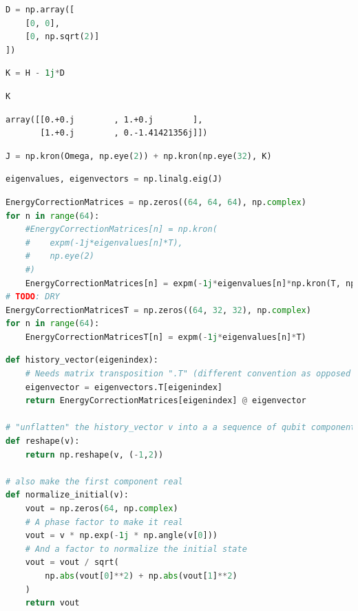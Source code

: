 \begin{lstlisting}[language=Python]
D = np.array([
    [0, 0],
    [0, np.sqrt(2)]
])
\end{lstlisting}

\begin{lstlisting}[language=Python]
K = H - 1j*D
\end{lstlisting}

\begin{lstlisting}[language=Python]
K
\end{lstlisting}

\begin{lstlisting}
array([[0.+0.j        , 1.+0.j        ],
       [1.+0.j        , 0.-1.41421356j]])
\end{lstlisting}

\begin{lstlisting}[language=Python]
J = np.kron(Omega, np.eye(2)) + np.kron(np.eye(32), K)
\end{lstlisting}

\begin{lstlisting}[language=Python]
eigenvalues, eigenvectors = np.linalg.eig(J)
\end{lstlisting}

\begin{lstlisting}[language=Python]
EnergyCorrectionMatrices = np.zeros((64, 64, 64), np.complex)
for n in range(64):
    #EnergyCorrectionMatrices[n] = np.kron(
    #    expm(-1j*eigenvalues[n]*T),
    #    np.eye(2)
    #)
    EnergyCorrectionMatrices[n] = expm(-1j*eigenvalues[n]*np.kron(T, np.eye(2)))
# TODO: DRY
EnergyCorrectionMatricesT = np.zeros((64, 32, 32), np.complex)
for n in range(64):
    EnergyCorrectionMatricesT[n] = expm(-1j*eigenvalues[n]*T)
\end{lstlisting}

\begin{lstlisting}[language=Python]
def history_vector(eigenindex):
    # Needs matrix transposition ".T" (different convention as opposed to Mathematica)
    eigenvector = eigenvectors.T[eigenindex]
    return EnergyCorrectionMatrices[eigenindex] @ eigenvector

# "unflatten" the history_vector v into a a sequence of qubit component pairs
def reshape(v):
    return np.reshape(v, (-1,2))

# also make the first component real
def normalize_initial(v):
    vout = np.zeros(64, np.complex)
    # A phase factor to make it real
    vout = v * np.exp(-1j * np.angle(v[0]))
    # And a factor to normalize the initial state
    vout = vout / sqrt(
        np.abs(vout[0]**2) + np.abs(vout[1]**2)
    )
    return vout
\end{lstlisting}

